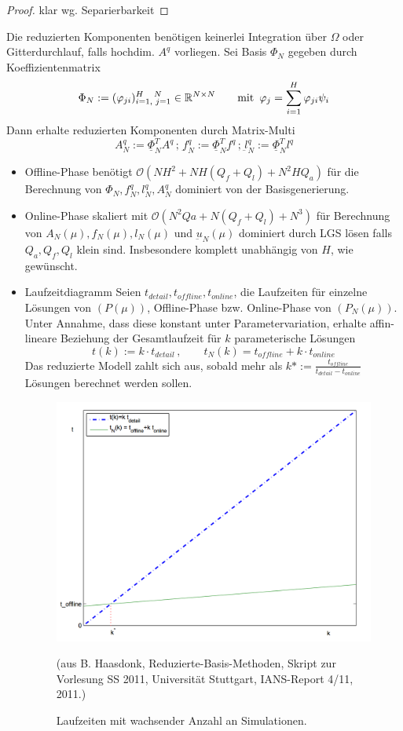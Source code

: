\begin{proof}
	klar wg. Separierbarkeit
\end{proof}

\begin{bem}
	Die reduzierten Komponenten benötigen keinerlei Integration über $\Omega$ oder Gitterdurchlauf, falls hochdim. $A^q$ vorliegen.
	Sei Basis $\Phi_N$ gegeben durch Koeffizientenmatrix
	\[
		\Phi_N := (\varphi_{ji})_{i = 1, \,\, j = 1}^{H \,\,\,\,\,\,\, N} \in \mathbb{R}^{N \times N} \qquad \text{mit \,} \varphi_{j} = \sum_{i=1}^{H} \varphi_{ji} \psi_i
	\]
	Dann erhalte reduzierten Komponenten durch Matrix-Multi
	\[
		A_N^q := \underline{\Phi}_N^T A^q \, ; \, \underbar f_N^q := \underline{\Phi}_N^T \underbar f^q \, ; \, \underbar l_N^q := \underline{\Phi}_N^T l^q
	\]
\end{bem}

\begin{bem} \beginwithlistbem
	\begin{itemize}
		\item Offline-Phase benötigt $\mathcal{O}(NH^2 + NH(Q_f + Q_l) + N^2HQ_a)$ für die Berechnung von $\Phi_N, f_N^q, l_N^q, A_N^q$ dominiert von der Basisgenerierung.
		\item Online-Phase skaliert mit $\mathcal{O}(N^2Qa + N(Q_f + Q_l) + N^3)$ für Berechnung von $A_N(\mu), f_N(\mu), l_N(\mu)$ und $\underbar u_N(\mu)$ dominiert durch LGS lösen falls $Q_a, Q_f, Q_l$ klein sind. Insbesondere komplett unabhängig von $H$, wie gewünscht.
		\item Laufzeitdiagramm
		Seien $t_{detail}, t_{offline}, t_{online}$, die Laufzeiten für einzelne Lösungen von $(P(\mu))$, Offline-Phase bzw. Online-Phase von $(P_N(\mu))$. Unter Annahme, dass diese konstant unter Parametervariation, erhalte affin-lineare Beziehung der Gesamtlaufzeit für $k$ parameterische Lösungen
		\[
			t(k) := k \cdot t_{detail} \, , \qquad t_N(k) = t_{offline} + k \cdot t_{online}
		\]
		Das reduzierte Modell zahlt sich aus, sobald mehr als $k* := \frac{t_{offline}}{t_{detail} - t_{online}}$ Lösungen berechnet werden sollen.
		\begin{figure}[H]
		\centering\small
		\includegraphics[width = 0.5 \textwidth]{Bilder/Laufzeiten.png}
		\caption{Laufzeiten mit wachsender Anzahl an Simulationen.}{(aus B. Haasdonk, Reduzierte-Basis-Methoden, Skript zur Vorlesung SS 2011, Universität Stuttgart, IANS-Report 4/11, 2011.)}
		\label{fig:Laufzeiten}
	\end{figure}
	\end{itemize}
\end{bem}

